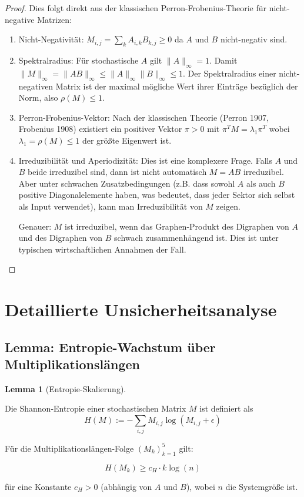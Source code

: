 \documentclass[a4paper,12pt]{article}
\theoremstyle{definition}
\newtheorem{lemma}{Lemma}
\begin{document}
\begin{proof}

Dies folgt direkt aus der klassischen Perron-Frobenius-Theorie für nicht-negative Matrizen:

\begin{enumerate}
\item Nicht-Negativität: $M_{i,j} = \sum_k A_{i,k} B_{k,j} \geq 0$ da $A$ und $B$ nicht-negativ sind.

\item Spektralradius: Für stochastische $A$ gilt $\|A\|_\infty = 1$. Damit $\|M\|_\infty = \|AB\|_\infty \leq \|A\|_\infty \|B\|_\infty \leq 1$. Der Spektralradius einer nicht-negativen Matrix ist der maximal mögliche Wert ihrer Einträge bezüglich der Norm, also $\rho(M) \leq 1$.

\item Perron-Frobenius-Vektor: Nach der klassischen Theorie (Perron 1907, Frobenius 1908) existiert ein positiver Vektor $\pi > 0$ mit $\pi^T M = \lambda_1 \pi^T$ wobei $\lambda_1 = \rho(M) \leq 1$ der größte Eigenwert ist.

\item Irreduzibilität und Aperiodizität: Dies ist eine komplexere Frage. Falls $A$ und $B$ beide irreduzibel sind, dann ist nicht automatisch $M = AB$ irreduzibel. Aber unter schwachen Zusatzbedingungen (z.B. dass sowohl $A$ als auch $B$ positive Diagonalelemente haben, was bedeutet, dass jeder Sektor sich selbst als Input verwendet), kann man Irreduzibilität von $M$ zeigen.

Genauer: $M$ ist irreduzibel, wenn das Graphen-Produkt des Digraphen von $A$ und des Digraphen von $B$ schwach zusammenhängend ist. Dies ist unter typischen wirtschaftlichen Annahmen der Fall.

\end{enumerate}

\end{proof}

\section{Detaillierte Unsicherheitsanalyse}

\subsection{Lemma: Entropie-Wachstum über Multiplikationslängen}

\begin{lemma}[Entropie-Skalierung]
\label{lem:entropie_skalierung}

Die Shannon-Entropie einer stochastischen Matrix $M$ ist definiert als
\[
H(M) := -\sum_{i,j} M_{i,j} \log(M_{i,j} + \epsilon)
\]

Für die Multiplikationslängen-Folge $(M_k)_{k=1}^5$ gilt:

\[
H(M_k) \geq c_H \cdot k \log(n)
\]

für eine Konstante $c_H > 0$ (abhängig von $A$ und $B$), wobei $n$ die Systemgröße ist.

\end{lemma}
\end{document}
